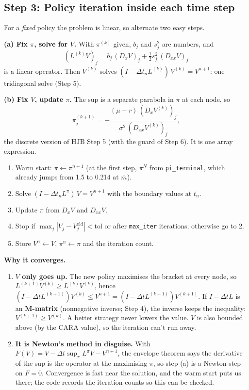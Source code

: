 \documentclass[11pt]{article}
\newcommand{\mb}{\bar m}
\begin{document}
\subsection*{Step 3: Policy iteration inside each time step}
For a \emph{fixed} policy the problem is linear, so alternate two easy steps.

\textbf{(a) Fix $\pi$, solve for $V$.} With $\pi^{(k)}$ given, $b_j$ and $s_j^2$ are numbers,
and
\[
  (L^{(k)}V)_j = b_j\,(D_xV)_j + \tfrac12 s_j^2\,(D_{xx}V)_j
\]
is a linear operator. Then $V^{(k)}$ solves $(I-\Delta t_n L^{(k)})\,V^{(k)} = V^{n+1}$: one
tridiagonal solve (Step 5).

\textbf{(b) Fix $V$, update $\pi$.} The sup is a separate parabola in $\pi$ at each node, so
\[
  \pi_j^{(k+1)} = -\frac{(\mu-r)\,(D_xV^{(k)})_j}{\sigma^2\,(D_{xx}V^{(k)})_j},
\]
the discrete version of HJB Step 5 (with the guard of Step 6). It is one array expression.

\begin{keyidea}
\begin{enumerate}[label=\arabic*.,leftmargin=*]
  \item Warm start: $\pi \leftarrow \pi^{n+1}$ (at the first step, $\pi^N$ from
        \texttt{pi\_terminal}, which already jumps from 1.5 to 0.214 at $\mb$).
  \item Solve $(I-\Delta t_n L^{\pi})\,V = V^{n+1}$ with the boundary values at $t_n$.
  \item Update $\pi$ from $D_xV$ and $D_{xx}V$.
  \item Stop if $\max_j|V_j-V_j^{\text{old}}|<\text{tol}$ or after \texttt{max\_iter}
        iterations; otherwise go to 2.
  \item Store $V^n\leftarrow V$, $\pi^n\leftarrow\pi$ and the iteration count.
\end{enumerate}
\end{keyidea}

\textbf{Why it converges.}
\begin{enumerate}[label=(\roman*)]
  \item \textbf{$V$ only goes up.} The new policy maximises the bracket at every node, so
        $L^{(k+1)}V^{(k)}\ge L^{(k)}V^{(k)}$, hence
        $(I-\Delta tL^{(k+1)})V^{(k)} \le V^{n+1} = (I-\Delta tL^{(k+1)})V^{(k+1)}$. If
        $I-\Delta tL$ is an \textbf{M-matrix} (nonnegative inverse; Step 4), the inverse
        keeps the inequality: $V^{(k+1)}\ge V^{(k)}$. A better strategy never lowers the value.
        $V$ is also bounded above (by the CARA value), so the iteration can't run away.
  \item \textbf{It is Newton's method in disguise.} With
        $F(V)=V-\Delta t\sup_\pi L^\pi V - V^{n+1}$, the envelope theorem says the derivative of
        the sup is the operator at the maximising $\pi$, so step (a) is a Newton step on
        $F=0$. Convergence is fast near the solution, and the warm start puts us there; the
        code records the iteration counts so this can be checked.
\end{enumerate}
\end{document}
